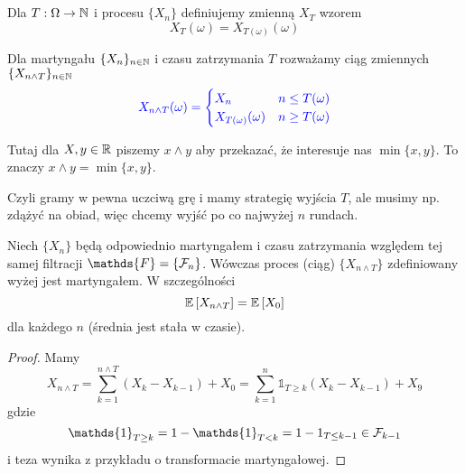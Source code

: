 \section{}

  Dla $T:\Omega\to\operatorname{\mathbb{N}}$ i procesu $\{X_n\}$ definiujemy zmienną $X_T$ wzorem
  $$X_T(\omega)=X_{T(\omega)}(\omega)$$

  Dla martyngału $\{X_n\}_{n\in\operatorname{\mathbb{N}}}$ i czasu zatrzymania $T$ rozważamy ciąg zmiennych $\{X_{n\land T}\}_{n\in\operatorname{\mathbb{N}}}$
  $$\color{blue}X_{n\land T}(\omega)=\begin{cases}X_n& n\leq T(\omega)\\ X_{T(\omega)}(\omega) & n\geq T(\omega) \end{cases}$$

  Tutaj dla $X,y\in\operatorname{\mathbb{R}}$ piszemy $x\land y$ aby przekazać, że interesuje nas $\min\{x,y\}$. To znaczy $x\land y=\min\{x,y\}$.

Czyli gramy w pewna uczciwą grę i mamy strategię wyjścia $T$, ale musimy np. zdążyć na obiad, więc chcemy wyjść po co najwyżej $n$ rundach.

\begin{theorem}
  Niech $\{X_n\}$ będą odpowiednio martyngałem i czasu zatrzymania względem tej samej filtracji $\mathds{F}=\{\set{F}_n\}$. Wówczas proces (ciąg) $\{X_{n\land T}\}$ zdefiniowany wyżej jest martyngałem. W szczególności
  $$\expected{X_{n\land T}}=\expected{X_0}$$
  dla każdego $n$ (średnia jest stała w czasie).
\end{theorem}

\begin{proof}
  Mamy 
  $$X_{n\land T}=\sum_{k=1}^{n\land T}(X_k-X_{k-1})+X_0=\sum_{k=1}^n\mathds{1}_{T\geq k}(X_k-X_{k-1})+X_9$$
  gdzie
  $$\mathds{1}_{T\geq k}=1-\mathds{1}_{T<k}=1-1_{T\leq k-1}\in \set{F}_{k-1}$$
  i teza wynika z przykładu o transformacie martyngałowej.
\end{proof}

